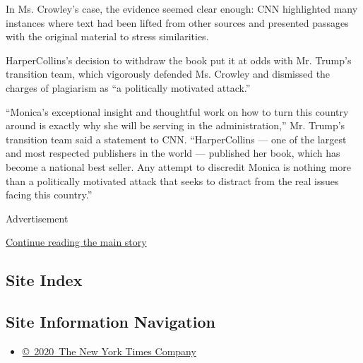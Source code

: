 In Ms. Crowley's case, the evidence seemed clear enough: CNN highlighted
many instances where text had been lifted from other sources and
presented passages with the original material to stress similarities.

HarperCollins's decision to withdraw the book put it at odds with Mr.
Trump's transition team, which vigorously defended Ms. Crowley and
dismissed the charges of plagiarism as ``a politically motivated
attack.''

``Monica's exceptional insight and thoughtful work on how to turn this
country around is exactly why she will be serving in the
administration,'' Mr. Trump's transition team said a statement to CNN.
``HarperCollins --- one of the largest and most respected publishers in
the world --- published her book, which has become a national best
seller. Any attempt to discredit Monica is nothing more than a
politically motivated attack that seeks to distract from the real issues
facing this country.''

Advertisement

\protect\hyperlink{after-bottom}{Continue reading the main story}

\hypertarget{site-index}{%
\subsection{Site Index}\label{site-index}}

\hypertarget{site-information-navigation}{%
\subsection{Site Information
Navigation}\label{site-information-navigation}}

\begin{itemize}
\tightlist
\item
  \href{https://help.nytimes.com/hc/en-us/articles/115014792127-Copyright-notice}{©~2020~The
  New York Times Company}
\end{itemize}

